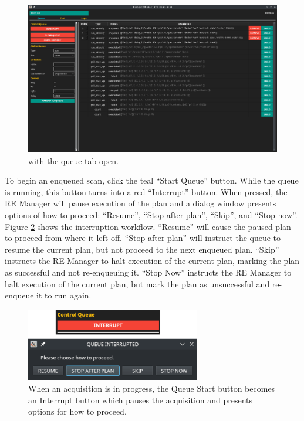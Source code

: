\begin{landscape}
\begin{figure}
\includegraphics[width=9in]{"acquisition/images/queue_tab"}
\caption[The Queue Tab]{
	\blueskycmds with the queue tab open.
}
\label{acq:fig:queue_tab}
\end{figure}
\end{landscape}

To begin an enqueued scan, click the teal ``Start Queue'' button.
While the queue is running, this button turns into a red ``Interrupt'' button.
When pressed, the RE Manager will pause execution of the plan and a dialog window presents options of how to proceed: ``Resume'', ``Stop after plan'', ``Skip'', and ``Stop now''.
Figure \ref{acq:fig:queue_interrupt} shows the interruption workflow.
``Resume'' will cause the paused plan to proceed from where it left off.
``Stop after plan'' will instruct the queue to resume the current plan, but not proceed to the next enqueued plan.
``Skip'' instructs the RE Manager to halt execution of the current plan, marking the plan as successful and not re-enqueuing it.
``Stop Now'' instructs the RE Manager to halt execution of the current plan, but mark the plan as unsuccessful and re-enqueue it to run again.

\begin{figure}
\includegraphics[width=3in]{"acquisition/images/queue_interrupted"}
\caption[The Interrupt Workflow]{
	When an acquisition is in progress, the Queue Start button becomes an Interrupt button which pauses the acquisition and presents options for how to proceed.
}
\label{acq:fig:queue_interrupt}
\end{figure}

